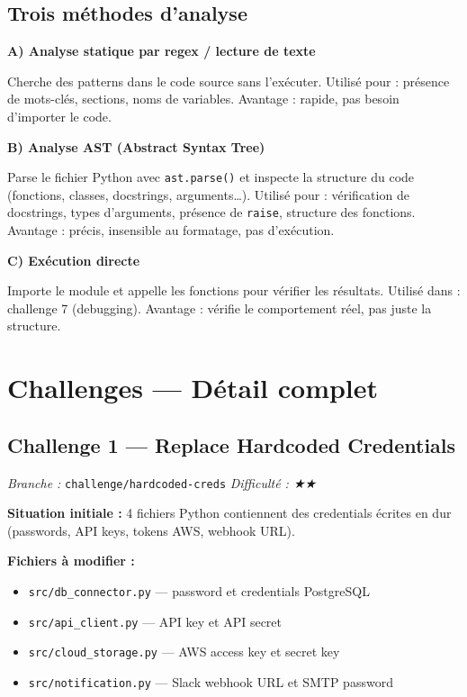 \documentclass[11pt,a4paper]{article}
\newcommand{\code}[1]{\texttt{#1}}
\begin{document}
\subsection{Trois méthodes d'analyse}

\textbf{A) Analyse statique par regex / lecture de texte}

Cherche des patterns dans le code source sans l'exécuter.
Utilisé pour : présence de mots-clés, sections, noms de variables.
Avantage : rapide, pas besoin d'importer le code.

\textbf{B) Analyse AST (Abstract Syntax Tree)}

Parse le fichier Python avec \code{ast.parse()} et inspecte la structure
du code (fonctions, classes, docstrings, arguments\ldots).
Utilisé pour : vérification de docstrings, types d'arguments, présence de
\code{raise}, structure des fonctions.
Avantage : précis, insensible au formatage, pas d'exécution.

\textbf{C) Exécution directe}

Importe le module et appelle les fonctions pour vérifier les résultats.
Utilisé dans : challenge 7 (debugging).
Avantage : vérifie le comportement réel, pas juste la structure.

\section{Challenges — Détail complet}

\subsection{Challenge 1 — Replace Hardcoded Credentials}
\textit{Branche :} \code{challenge/hardcoded-creds} \quad \textit{Difficulté : ★★}

\textbf{Situation initiale :}
4 fichiers Python contiennent des credentials écrites en dur (passwords,
API keys, tokens AWS, webhook URL).

\textbf{Fichiers à modifier :}
\begin{itemize}
  \item \code{src/db\_connector.py} — password et credentials PostgreSQL
  \item \code{src/api\_client.py} — API key et API secret
  \item \code{src/cloud\_storage.py} — AWS access key et secret key
  \item \code{src/notification.py} — Slack webhook URL et SMTP password
\end{itemize}
\end{document}
